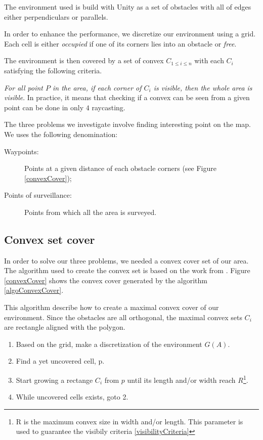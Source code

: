 The environment used is build with Unity as a set of obstacles with all of edges either perpendiculars or parallels.

In order to enhance the performance, we discretize our environment using a grid. Each cell is either \emph{occupied} if one of its corners lies into an obstacle or \emph{free}.

The environment is then covered by a set of convex $C_{1\leq i \leq n}$ with each $C_i$ satisfying the following criteria.

\begin{criteria}[of Visibility]
 \emph{For all point $P$ in the area, if each corner of $C_i$ is visible, then the whole area is visible}. In practice, it means that checking if a convex can be seen from a given point can be done in only $4$ raycasting.
\label{visibilityCriteria}
\end{criteria}

The three problems we investigate involve finding interesting point on the map. We uses the following denomination:
\begin{description}
	\item[Waypoints:] Points at a given distance of each obstacle corners (see Figure \ref{convexCover});
	\item[Points of surveillance:] Points from which all the area is surveyed.
\end{description}

\subsection{Convex set cover}

In order to solve our three problems, we needed a convex cover set of our area. The algorithm used to create the convex set is based on the work from \cite{CoopMinTime}. Figure \ref{convexCover} shows the convex cover generated by the algorithm \ref{algoConvexCover}.

\begin{algorithm}
This algorithm describe how to create a maximal convex cover of our environment. Since the obstacles are all orthogonal, the maximal convex sets $C_i$ are rectangle aligned with the polygon.
\begin{enumerate}
\item Based on the grid, make a discretization of the environment $G(A)$.
\item Find a yet uncovered cell, p.
\item Start growing a rectange $C_i$ from $p$ until its length and/or width reach $R$\footnote{R is the maximum convex size in width and/or length. This parameter is used to guarantee the visibily criteria \ref{visibilityCriteria}}.
\item While uncovered cells exists, goto 2.
\end{enumerate}
\label{algoConvexCover}
\end{algorithm}

